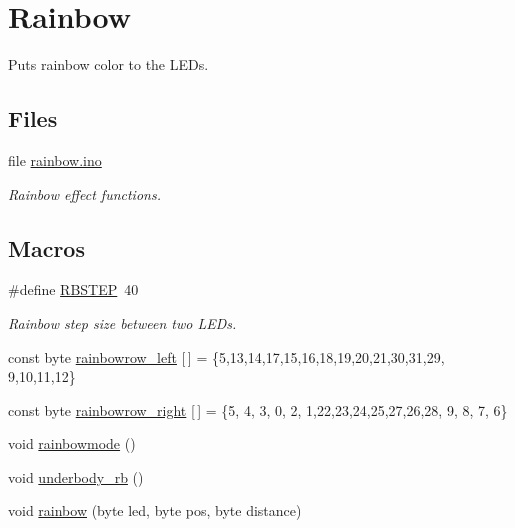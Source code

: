 \hypertarget{group__rainbow}{}\section{Rainbow}
\label{group__rainbow}


Puts rainbow color to the L\+E\+Ds.  


\subsection*{Files}
\begin{DoxyCompactItemize}
\item 
file \hyperlink{rainbow_8ino}{rainbow.\+ino}
\begin{DoxyCompactList}\small\item\em Rainbow effect functions. \end{DoxyCompactList}\end{DoxyCompactItemize}
\subsection*{Macros}
\begin{DoxyCompactItemize}
\item 
\#define \hyperlink{group__rainbow_ga36ae3bd3da884ff03d7306f674f70dea}{R\+B\+S\+T\+EP}~40
\begin{DoxyCompactList}\small\item\em Rainbow step size between two L\+E\+Ds. \end{DoxyCompactList}\end{DoxyCompactItemize}
\begin{DoxyCompactItemize}
\item 
const byte \hyperlink{group__rainbow_gad4e8497757364dbc8187298bd87acc44}{rainbowrow\+\_\+left} \mbox{[}$\,$\mbox{]} = \{5,13,14,17,15,16,18,19,20,21,30,31,29, 9,10,11,12\}
\item 
const byte \hyperlink{group__rainbow_ga00c047fede9a8b6c020ba1d108d63cea}{rainbowrow\+\_\+right} \mbox{[}$\,$\mbox{]} = \{5, 4, 3, 0, 2, 1,22,23,24,25,27,26,28, 9, 8, 7, 6\}
\item 
void \hyperlink{group__rainbow_ga51e30a1c423190e50127c6651c991612}{rainbowmode} ()
\item 
void \hyperlink{group__rainbow_ga3656f41cfe48a0bf63e63099673ac4c4}{underbody\+\_\+rb} ()
\item 
void \hyperlink{group__rainbow_ga80198b192c269a2b71cfa41654a3aafd}{rainbow} (byte led, byte pos, byte distance)
\end{DoxyCompactItemize}


